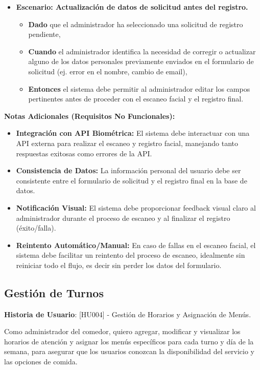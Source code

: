 \documentclass[12pt]{article}
\begin{document}
\begin{itemize}
    \item \textbf{Escenario: Actualización de datos de solicitud antes del registro.}
    \begin{itemize}
        \item \textbf{Dado} que el administrador ha seleccionado una solicitud de registro pendiente,
        \item \textbf{Cuando} el administrador identifica la necesidad de corregir o actualizar alguno de los datos personales previamente enviados en el formulario de solicitud (ej. error en el nombre, cambio de email),
        \item \textbf{Entonces} el sistema debe permitir al administrador editar los campos pertinentes antes de proceder con el escaneo facial y el registro final.
    \end{itemize}
\end{itemize}

\textbf{Notas Adicionales (Requisitos No Funcionales):}
\begin{itemize}
    \item \textbf{Integración con API Biométrica:} El sistema debe interactuar con una API externa para realizar el escaneo y registro facial, manejando tanto respuestas exitosas como errores de la API.
    \item \textbf{Consistencia de Datos:} La información personal del usuario debe ser consistente entre el formulario de solicitud y el registro final en la base de datos.
    \item \textbf{Notificación Visual:} El sistema debe proporcionar feedback visual claro al administrador durante el proceso de escaneo y al finalizar el registro (éxito/falla).
    \item \textbf{Reintento Automático/Manual:} En caso de fallas en el escaneo facial, el sistema debe facilitar un reintento del proceso de escaneo, idealmente sin reiniciar todo el flujo, es decir sin perder los datos del formulario.
\end{itemize}

\subsection{Gestión de Turnos}

\textbf{Historia de Usuario}: [HU004] - Gestión de Horarios y Asignación de Menús.

Como administrador del comedor, quiero agregar, modificar y visualizar los horarios de atención y asignar los menús específicos para cada turno y día de la semana, para asegurar que los usuarios conozcan la disponibilidad del servicio y las opciones de comida.
\end{document}
